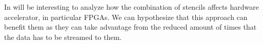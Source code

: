 \documentclass{acm_proc_article-sp}
\begin{document}
In will be interesting to analyze how the combination of stencils affects hardware accelerator, in particular FPGAs. We can hypothesize that this approach can benefit them as they can take advantage from the reduced amount of times that the data has to be streamed to them.
 
%




\balancecolumns
\end{document}
